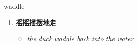 
\begin{frame}
{\huge waddle}
\begin{center}
\begin{enumerate}\Large
  \item \textbf{摇摇摆摆地走}
  \begin{itemize}
    \item \em{\Large{the duck waddle back into the water}}
  \end{itemize}
\end{enumerate}
\end{center}
\end{frame}
